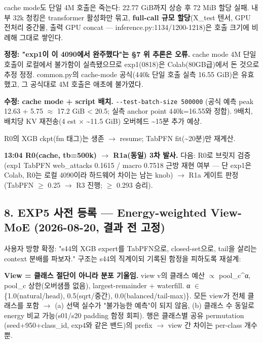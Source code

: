 \par\noindent \textbullet\enspace cache mode도 단일 4M 호출은 죽는다: 22.77 GiB까지 상승 후 72 MiB 할당 실패. 내부 32k 청킹은 transformer 활성화만 묶고, \textbf{full-call 규모 할당}(X\_\allowbreak{}test 텐서, GPU 전처리 중간물, 출력 GPU concat — inference.py:1134/\allowbreak{}1200-1218)은 호출 크기에 비례해 그대로 쌓인다.


\par\noindent \textbullet\enspace \textbf{정정: "exp1이 이 4090에서 완주했다"는 §7 위 추론은 오류.} cache mode 4M 단일 호출이 로컬에서 불가함이 실측됐으므로 exp1(0818)은 Colab(80GB급)에서 돈 것으로 추정 정정. common.py의 cache-mode 공식(440k 단일 호출 실측 16.55 GiB)은 유효했고, 그 공식대로 4M 호출은 애초에 불가였다.


\par\noindent \textbullet\enspace \textbf{수정: cache mode +\allowbreak{} script 배치.} \texttt{-\allowbreak{}-\allowbreak{}test-\allowbreak{}b\allowbreak{}atch-\allowbreak{}siz\allowbreak{}e 500000\allowbreak{}} (공식 예측 peak 12.63 +\allowbreak{} 5.75 \ensuremath{\approx} 17.2 GiB < 20.5; 실측 anchor point 440k=\allowbreak{}16.55와 정합). 9배치, 배치당 KV 재전송(4 est × \textasciitilde{}11.5 GiB) 오버헤드 \textasciitilde{}15분 추가 예상.


\par\noindent \textbullet\enspace R0의 XGB ckpt(fm 태그)는 생존  \ensuremath{\rightarrow}  resume; TabPFN fit(\textasciitilde{}20분)만 재계산.


\textbf{13:04 R0(cache, tb=\allowbreak{}500k)  \ensuremath{\rightarrow}  R1a(동일) 3차 발사.} 다음: R0로 브릿지 검증(exp1 TabPFN web\_\allowbreak{}attacks 0.1615 /\allowbreak{} macro 0.7518 근방 재현 여부 — 단 exp1은 Colab, R0는 로컬 4090이라 하드웨어 차이는 남는 knob)  \ensuremath{\rightarrow}  R1a 게이트 판정 (TabPFN \ensuremath{\geq} 0.25  \ensuremath{\rightarrow}  R3 진행; \ensuremath{\geq} 0.293 승리).

\subsection{8. EXP5 사전 등록 — Energy-weighted View-MoE (2026-08-20, 결과 전 고정)}
사용자 방향 확정: "s44의 XGB expert를 TabPFN으로, closed-set으로, tail을 살리는 context 분배를 파보자." 구조는 s44의 직계이되 기록된 함정을 피하도록 재설계:

\par\noindent \textbullet\enspace \textbf{View =\allowbreak{} 클래스 절단이 아니라 분포 기울임.} view v의 클래스 예산 \ensuremath{\propto} pool\_\allowbreak{}c\textasciicircum{}α, pool\_\allowbreak{}c 상한(오버샘플 없음), largest-remainder +\allowbreak{} waterfill. α \ensuremath{\in} \{1.0(natural/\allowbreak{}head), 0.5(sqrt/\allowbreak{}중간), 0.0(balanced/\allowbreak{}tail-max)\}. 모든 view가 전체 클래스를 포함  \ensuremath{\rightarrow}  (a) 선택 실수가 "불가능한 예측"이 되지 않음, (b) 클래스 수 동일로 energy 비교 가능(s01/\allowbreak{}s20 padding 함정 회피). 행은 클래스별 공유 permutation (seed+\allowbreak{}950+\allowbreak{}class\_\allowbreak{}id, exp4와 같은 밴드)의 prefix  \ensuremath{\rightarrow}  view 간 차이는 per-class 개수뿐.


